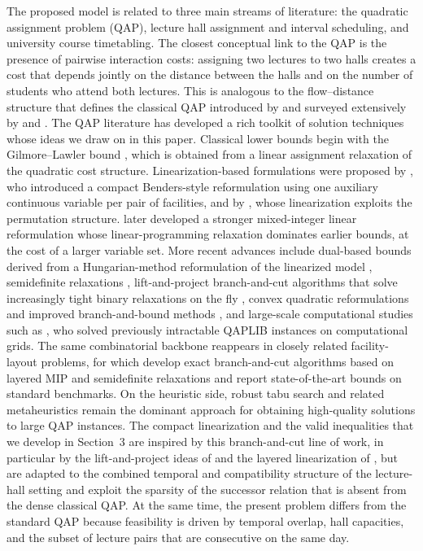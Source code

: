 \documentclass[11pt]{article}
\begin{document}
The proposed model is related to three main streams of literature: the quadratic assignment problem (QAP), lecture hall assignment and interval scheduling, and university course timetabling. The closest conceptual link to the QAP is the presence of pairwise interaction costs: assigning two lectures to two halls creates a cost that depends jointly on the distance between the halls and on the number of students who attend both lectures. This is analogous to the flow--distance structure that defines the classical QAP introduced by \citet{koopmans1957} and surveyed extensively by \citet{burkard1998} and \citet{loiola2007}. The QAP literature has developed a rich toolkit of solution techniques whose ideas we draw on in this paper. Classical lower bounds begin with the Gilmore--Lawler bound \citep{gilmore1962,lawler1963}, which is obtained from a linear assignment relaxation of the quadratic cost structure. Linearization-based formulations were proposed by \citet{kaufman1978}, who introduced a compact Benders-style reformulation using one auxiliary continuous variable per pair of facilities, and by \citet{frieze1983}, whose linearization exploits the permutation structure. \citet{adams1994} later developed a stronger mixed-integer linear reformulation whose linear-programming relaxation dominates earlier bounds, at the cost of a larger variable set. More recent advances include dual-based bounds derived from a Hungarian-method reformulation of the linearized model \citep{hahn1998}, semidefinite relaxations \citep{zhao1998}, lift-and-project branch-and-cut algorithms that solve increasingly tight binary relaxations on the fly \citep{burer2006}, convex quadratic reformulations and improved branch-and-bound methods \citep{anstreicher2003}, and large-scale computational studies such as \citet{anstreicher2002}, who solved previously intractable QAPLIB instances on computational grids. The same combinatorial backbone reappears in closely related facility-layout problems, for which \citet{fischer2019} develop exact branch-and-cut algorithms based on layered MIP and semidefinite relaxations and report state-of-the-art bounds on standard benchmarks. On the heuristic side, robust tabu search \citep{taillard1991} and related metaheuristics remain the dominant approach for obtaining high-quality solutions to large QAP instances. The compact linearization and the valid inequalities that we develop in Section~3 are inspired by this branch-and-cut line of work, in particular by the lift-and-project ideas of \citet{burer2006} and the layered linearization of \citet{fischer2019}, but are adapted to the combined temporal and compatibility structure of the lecture-hall setting and exploit the sparsity of the successor relation that is absent from the dense classical QAP. At the same time, the present problem differs from the standard QAP because feasibility is driven by temporal overlap, hall capacities, and the subset of lecture pairs that are consecutive on the same day.
\end{document}
